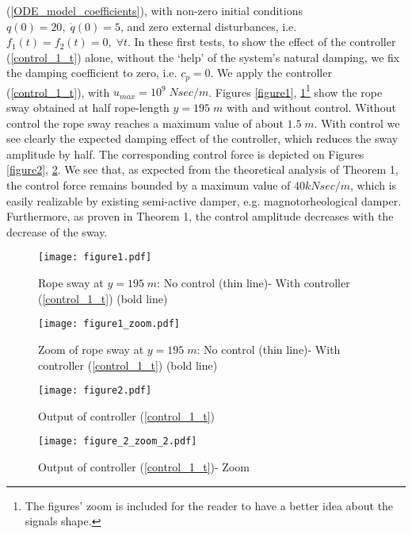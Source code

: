 \documentclass[letterpaper, 11 pt, conference]{ieeeconf}
\begin{document}
(\ref{ODE_model_coefficients}), with non-zero initial conditions
$q(0)=20,\;\dot{q}(0)=5$, and zero external disturbances, i.e.
$f_{1}(t)=f_{2}(t)=0,\;\forall t$. In these first tests, to show
the effect of the controller (\ref{control_1_t}) alone, without
the `help' of the system's natural damping, we fix the damping
coefficient to zero, i.e. $c_{p}=0$. We apply the controller
(\ref{control_1_t}), with $u_{max}=10^9\;N sec/m$. Figures
\ref{figure1}, \ref{figure1_zoom}\footnote{The figures' zoom is
included for the reader to have a better idea about the signals
shape.} show the rope sway obtained at half rope-length $y=195\;m$
with and without control. Without control the rope sway reaches a
maximum value of about $1.5\;m$. With control we see clearly the
expected damping effect of the controller, which reduces the sway
amplitude by half. The corresponding control force is depicted on
Figures \ref{figure2}, \ref{figure2_zoom}. We see that, as
expected from the theoretical analysis of Theorem 1, the control
force remains bounded by a maximum value of $40 k N sec/m$, which
is easily realizable by existing semi-active damper, e.g.
magnotorheological damper. Furthermore, as proven in Theorem 1,
the control amplitude decreases with the decrease of the sway.

\begin{figure}
\centering
\texttt{[image: figure1.pdf]}\vspace{-3cm}
\caption{Rope sway at $y=195\;m$: No control (thin line)- With
controller (\ref{control_1_t}) (bold line)}
\label{figure1}\vspace{-3cm}
\texttt{[image: figure1\_zoom.pdf]}\vspace{-3cm}
\caption{Zoom of rope sway at $y=195\;m$: No control (thin line)-
With controller (\ref{control_1_t}) (bold line)}
\label{figure1_zoom}
\end{figure}
\begin{figure}
\centering
\texttt{[image: figure2.pdf]}\vspace{-3cm}
\caption{Output of controller (\ref{control_1_t})} \label{figure2}
\vspace{-3cm}
\texttt{[image: figure\_2\_zoom\_2.pdf]}\vspace{-3cm}
\label{theorem3-sway-control-u-zoom} \caption{Output of controller
(\ref{control_1_t})- Zoom} \label{figure2_zoom}
\end{figure}
\end{document}
